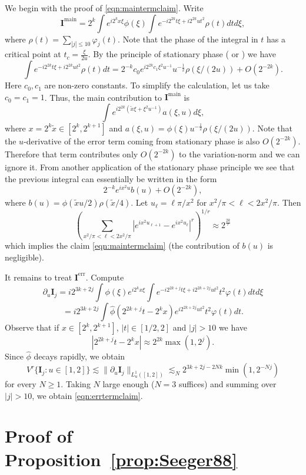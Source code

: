 \documentclass[12pt,leqno]{amsart}
\theoremstyle{plain}
\numberwithin{equation}{section}
\begin{document}
We begin with the proof of \eqref{eqn:maintermclaim}. Write
\[ \mathbf{I}^{\text{main}} = 2^k \int e^{i2^k x\xi} \phi(\xi) \int e^{-i2^{2k}t\xi+i2^{2k} ut^2} \rho(t) dt d\xi,\]
where $\rho(t) = \sum_{|j|\le 10} \varphi_j(t)$. Note that the phase of the integral in $t$ has a critical point at $t_c = \frac{\xi}{2u}$. By the principle of stationary phase (\cite[Chapter VIII.5.7]{MR1232192} or \cite[Theorem 1.2.1]{MR1205579}) we have\[ \int e^{-i2^{2k}t\xi+i2^{2k} ut^2} \rho(t) dt = 2^{-k} c_0 e^{i2^{2k} c_1 \xi^2 u^{-1}} u^{-\frac12} \rho(\xi/(2u)) + O(2^{-2k}).\]
Here $c_0,c_1$ are non-zero constants. To simplify the calculation, let us take $c_0=c_1=1$. Thus, the main contribution to $\mathbf{I}^{\textrm{main}}$ is
\[ \int e^{i 2^{2k}(\tilde{x}\xi+\xi^2 u^{-1})} a(\xi,u) d\xi,\]
where $x=2^k \tilde{x}\in [2^k,2^{k+1}]$ and $a(\xi,u) =  \phi(\xi) u^{-\frac12} \rho(\xi/(2u)).$
Note that the $u$-derivative of the error term coming from stationary phase is also $O(2^{-2k})$. Therefore that term contributes only $O(2^{-2k})$ to the variation-norm and we can ignore it. From another application of the stationary phase principle we see that the previous integral can essentially be written in the form
\[ 2^{-k} e^{ix^2 u} b(u) + O(2^{-2k}),\]
where $b(u)=\phi(\tilde{x}u/2) \rho(\tilde{x}/4)$. Let $u_\ell = \ell \pi / x^2$ for $x^2/\pi <\ell<2x^2/\pi$.
Then 
\[ \left(\sum_{x^2/\pi <\ell<2x^2/\pi} |e^{ix^2 u_{\ell+1}}-e^{ix^2 u_\ell}|^r\right)^{1/r} \approx 2^{\frac{2k}{r}} \]
which implies the claim \eqref{eqn:maintermclaim} (the contribution of $b(u)$ is negligible).

It remains to treat $\mathbf{I}^{\textrm{err}}$. Compute
\[\partial_u \mathbf{I}_j= i 2^{3k+2j} \int \phi(\xi) e^{i2^k x\xi} \int e^{-i2^{2k+j}t\xi+i2^{2k+2j}ut^2} t^2 \varphi(t) dt d\xi\]
\[= i 2^{3k+2j} \int \widehat{\phi}(2^{2k+j}t-2^k x) e^{i2^{2k+2j}ut^2} t^2 \varphi(t) dt.\]
Observe that if $x\in[2^k,2^{k+1}]$, $|t|\in [1/2,2]$ and $|j|>10$ we have
\[ |2^{2k+j}t-2^k x|\approx 2^{2k} \max(1,2^j). \]
Since $\widehat{\phi}$ decays rapidly, we obtain
\[ V^r \{ \mathbf{I}_j \colon u \in [1,2]\} \lesssim \|\partial_u \mathbf{I}_j\|_{L^1_u([1,2])} \lesssim_N 2^{3k+2j-2Nk} \min(1,2^{-Nj}) \]
for every $N\ge 1$. Taking $N$ large enough ($N=3$ suffices) and summing over $|j| > 10$, we obtain \eqref{eqn:errtermclaim}.


\section{Proof of Proposition~\ref{prop:Seeger88}}\label{180320section7}
\end{document}
